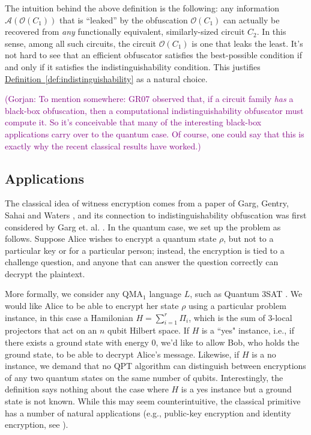 \documentclass[11pt]{article}
\numberwithin{equation}{section}
\newcommand{\expref}[2]{\texorpdfstring{\hyperref[#2]{#1~\ref{#2}}}{#1~\ref{#2}}}
\newcommand{\ga}[1]{{ \textcolor{purple}{(Gorjan:  #1)}}{}}
\begin{document}
{The intuition behind the above definition is the following: any information $\mathcal A(\mathcal O(C_1))$ that is ``leaked'' by the obfuscation $\mathcal O(C_1)$ can actually be recovered from \emph{any} functionally equivalent, similarly-sized circuit $C_2$. In this sense, among all such circuits, the circuit $\mathcal O(C_1)$ is one that leaks the least. It's not hard to see that an efficient obfuscator satisfies the best-possible condition if and only if it satisfies the indistinguishability condition. This justifies \expref{Definition}{def:indistinguishability} as a natural choice.

\ga{To mention somewhere: GR07 observed that, if a circuit family \emph{has} a black-box obfuscation, then a computational indistinguishability obfuscator must compute it. So it's conceivable that many of the interesting black-box applications carry over to the quantum case. Of course, one could say that this is exactly why the recent classical results have worked.}


\subsection{Applications}

 The classical idea of witness encryption comes from a paper of Garg, Gentry, Sahai and Waters \cite{GGSW13}, and its connection to indistinguishability obfuscation was first considered by Garg et. al. \cite{GGHRSW13}. In the quantum case, we set up the problem as follows. Suppose Alice wishes to encrypt a quantum state $\rho$, but not to a particular key or for a particular person; instead, the encryption is tied to a challenge question, and anyone that can answer the question correctly can decrypt the plaintext. 

More formally, we consider any QMA$_{1}$ language $L$, such as Quantum $3$SAT \cite{GN13}.  We would like Alice to be able to encrypt her state $\rho$ using a particular problem instance, in this case a Hamilonian $H=\sum_{i=1}^r \Pi_{i}$, which is the sum of 3-local projectors that act on an $n$ qubit Hilbert space.  If $H$ is a ``yes" instance, i.e., if there exists a ground state with energy 0, we'd like to allow Bob, who holds the ground state, to be able to decrypt Alice's message.  Likewise, if $H$ is a no instance, we demand that no QPT algorithm can distinguish between encryptions of any two quantum states  on the same number of qubits.  Interestingly, the definition says nothing about the case where $H$ is a yes instance but a ground state is not known. While this may seem counterintuitive, the classical primitive has a number of natural applications (e.g., public-key encryption and identity encryption, see \cite{GGSW13}). 

}
\end{document}
